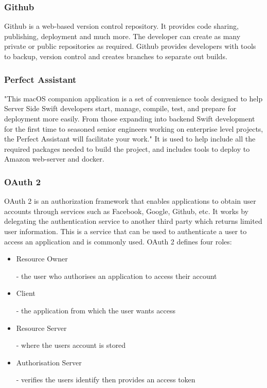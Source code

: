 \subsubsection{Github}

Github \cite{github} is a web-based version control repository. It provides code sharing, publishing, deployment and much more. The developer can create as many private or public repositories as required. Github provides developers with tools to backup, version control and creates branches to separate out builds.

\subsubsection{Perfect Assistant}
"This macOS companion application is a set of convenience tools designed to help Server Side Swift developers start, manage, compile, test, and prepare for deployment more easily. From those expanding into backend Swift development for the first time to seasoned senior engineers working on enterprise level projects, the Perfect Assistant will facilitate your work." \cite{perfectAssist} It is used to help include all the required packages needed to build the project, and includes tools to deploy to Amazon web-server and docker.

\subsubsection{OAuth 2}
OAuth 2 \cite{oauth} is an authorization framework that enables applications to obtain user accounts through services such as Facebook, Google, Github, etc. It works by delegating the authentication service to another third party which returns limited user information. This is a service that can be used to authenticate a user to access an application and is commonly used. OAuth 2 defines four roles:

\begin{itemize}
  \item Resource Owner
  
  - the user who authorises an application to access their account
  \item Client
  
  - the application from which the user wants access
  \item Resource Server
  
  - where the users account is stored
  
  \item Authorisation Server
  
  - verifies the users identify then provides an access token
\end{itemize}

